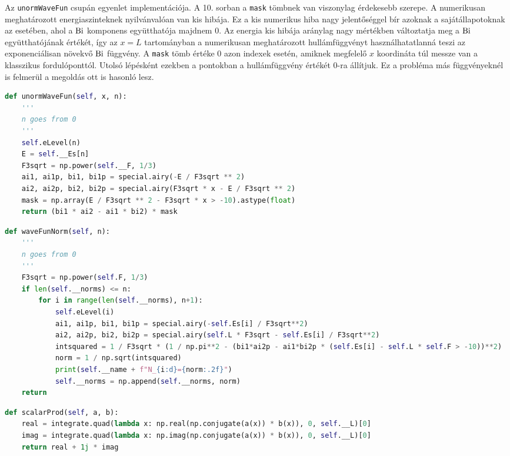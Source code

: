 Az \texttt{unormWaveFun} csupán  egyenlet implementációja. A 10. sorban a \texttt{mask} tömbnek van viszonylag érdekesebb szerepe. A numerikusan meghatározott energiaszinteknek nyilvánvalóan van kis hibája. Ez a kis numerikus hiba nagy jelentőséggel bír azoknak a sajátállapotoknak az esetében, ahol a $\operatorname{Bi}$ komponens együtthatója majdnem $0$. Az energia kis hibája aránylag nagy mértékben változtatja meg a $\operatorname{Bi}$ együtthatójának értékét, így az $x=L$ tartományban a numerikusan meghatározott hullámfüggvényt használhatatlanná teszi az exponenciálisan növekvő $\operatorname{Bi}$ függvény. A \texttt{mask} tömb értéke $0$ azon indexek esetén, amiknek megfelelő $x$ koordináta túl messze van a klasszikus fordulóponttól. Utolsó lépésként ezekben a pontokban a hullámfüggvény értékét $0$-ra állítjuk. Ez a probléma más függvényeknél is felmerül a megoldás ott is hasonló lesz.
\begin{lstlisting}[language=Python]
def unormWaveFun(self, x, n):
    '''
    n goes from 0
    '''
    self.eLevel(n)
    E = self.__Es[n]
    F3sqrt = np.power(self.__F, 1/3)
    ai1, ai1p, bi1, bi1p = special.airy(-E / F3sqrt ** 2)
    ai2, ai2p, bi2, bi2p = special.airy(F3sqrt * x - E / F3sqrt ** 2)
    mask = np.array(E / F3sqrt ** 2 - F3sqrt * x > -10).astype(float)
    return (bi1 * ai2 - ai1 * bi2) * mask
\end{lstlisting}
 \Aeqref{}
\begin{lstlisting}[language=Python]
def waveFunNorm(self, n):
    '''
    n goes from 0
    '''
    F3sqrt = np.power(self.F, 1/3)
    if len(self.__norms) <= n:
        for i in range(len(self.__norms), n+1):
            self.eLevel(i)
            ai1, ai1p, bi1, bi1p = special.airy(-self.Es[i] / F3sqrt**2)
            ai2, ai2p, bi2, bi2p = special.airy(self.L * F3sqrt - self.Es[i] / F3sqrt**2)
            intsquared = 1 / F3sqrt * (1 / np.pi**2 - (bi1*ai2p - ai1*bi2p * (self.Es[i] - self.L * self.F > -10))**2)
            norm = 1 / np.sqrt(intsquared)
            print(self.__name + f"N_{i:d}={norm:.2f}")
            self.__norms = np.append(self.__norms, norm)
    return
\end{lstlisting}

\begin{lstlisting}[language=Python]
def scalarProd(self, a, b):
    real = integrate.quad(lambda x: np.real(np.conjugate(a(x)) * b(x)), 0, self.__L)[0]
    imag = integrate.quad(lambda x: np.imag(np.conjugate(a(x)) * b(x)), 0, self.__L)[0]
    return real + 1j * imag
\end{lstlisting}

